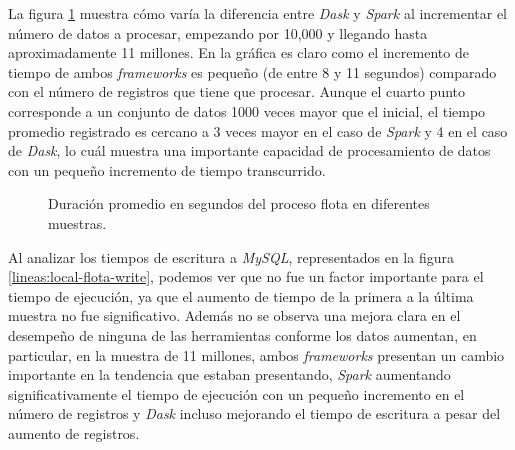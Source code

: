 La figura \ref{lineas:local-flota} muestra cómo varía la diferencia entre \textit{Dask} y \textit{Spark} al incrementar el número de datos a procesar, empezando por 10,000 y llegando hasta aproximadamente 11 millones. En la gráfica es claro como el incremento de tiempo de ambos \textit{frameworks} es pequeño (de entre 8 y 11 segundos) comparado con el número de registros que tiene que procesar. Aunque el cuarto punto corresponde a un conjunto de datos 1000 veces mayor que el inicial, el tiempo promedio registrado es cercano a 3 veces mayor en el caso de \textit{Spark} y 4 en el caso de \textit{Dask}, lo cuál muestra una importante capacidad de procesamiento de datos con un pequeño incremento de tiempo transcurrido. 
\begin{figure}
\centering
{}
\caption{Duración promedio en segundos del proceso flota en diferentes muestras.}
\label{lineas:local-flota}
\end{figure}

Al analizar los tiempos de escritura a \textit{MySQL}, representados en la figura \ref{lineas:local-flota-write}, podemos ver que no fue un factor importante para el tiempo de ejecución, ya que el aumento de tiempo de la primera a la última muestra no fue significativo. Además no se observa una mejora clara en el desempeño de ninguna de las herramientas conforme los datos aumentan, en particular, en la muestra de 11 millones, ambos \textit{frameworks} presentan un cambio importante en la tendencia que estaban presentando, \textit{Spark} aumentando significativamente el tiempo de ejecución con un pequeño incremento en el número de registros y \textit{Dask} incluso mejorando el tiempo de escritura a pesar del aumento de registros.

